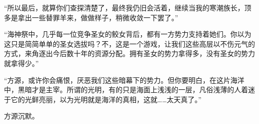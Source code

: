 \begin{this_body}
“所以最后，就算你们查探清楚了，最终我仍旧会活着，继续当我的寒潮族长，顶多是拿出一些替罪羊来，做做样子，稍微收敛一下罢了。”

“海神祭中，几乎每一位竞争圣女的鲛女背后，都有一方势力支持着她们。你以为这只是简简单单的圣女选拔吗？不，这是一个游戏，让我们这些高层以不伤元气的方式，来角逐出今后数十年的资源分配。拥有圣女的势力拿得多，没有圣女的势力就拿得少。”

“方源，或许你会痛恨，厌恶我们这些暗幕下的势力。但你要明白，在这片海洋中，黑暗才是主宰。所谓的光明，有的只是海面上浅浅的一层，凡俗浅薄的人着迷于它的光鲜亮丽，以为光明就是海洋的真相，这就……太天真了。”

方源沉默。

\end{this_body}

